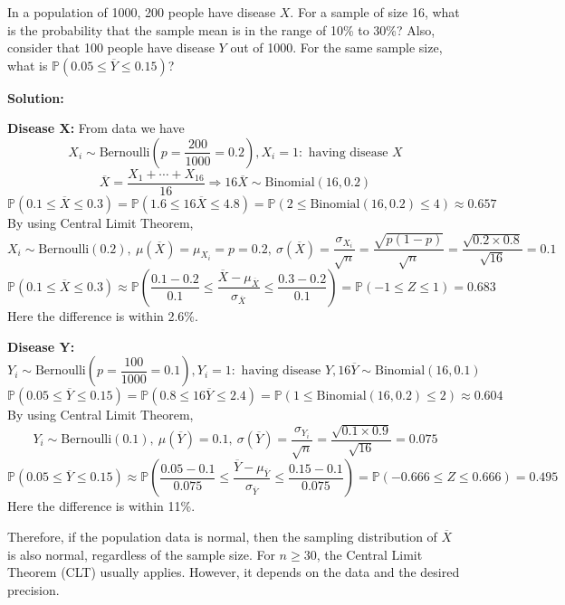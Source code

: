 \begin{eg}
  In a population of 1000, 200 people have disease \(X\). For a sample of size 16, what is the probability that the sample mean is in the range of 10\% to 30\%? Also, consider that 100 people have disease \(Y\) out of 1000. For the same sample size, what is \(\mathbb{P}(0.05 \leq \overline{Y} \leq 0.15)\)?

  \textbf{Solution:} 

  \textbf{Disease X:}
  From data we have 
  \[
    X_i \sim \text{Bernoulli}\left(p = \dfrac{200}{1000} = 0.2\right), X_i = 1: \text{ having disease } X
  \]
  \[
    \overline{X} = \dfrac{X_1 + \cdots + X_{16}}{16} \Longrightarrow 16\overline{X} \sim \text{Binomial}(16, 0.2)
  \]
  \[
    \mathbb{P}(0.1 \leq \overline{X} \leq 0.3) = \mathbb{P}(1.6 \leq 16\overline{X} \leq 4.8) = \mathbb{P}(2 \leq \text{Binomial}(16, 0.2) \leq 4) \approx 0.657
  \]
  By using Central Limit Theorem, 
  \[
    X_i \sim \text{Bernoulli}(0.2),\ \mu(\overline{X}) = \mu_{X_i} = p = 0.2,\ \sigma(\overline{X}) = \dfrac{\sigma_{X_i}}{\sqrt{n}} = \dfrac{\sqrt{p(1 - p)}}{\sqrt{n}} = \dfrac{\sqrt{0.2 \times 0.8}}{\sqrt{16}} = 0.1
  \]
  \[
    \mathbb{P}(0.1 \leq \overline{X} \leq 0.3) \approx \mathbb{P}\left(\dfrac{0.1 - 0.2}{0.1} \leq \dfrac{\overline{X} - \mu_{\overline{X}}}{\sigma_{\overline{X}}} \leq \dfrac{0.3 - 0.2}{0.1}\right) = \mathbb{P}(-1 \leq Z \leq 1) = 0.683
  \]
  Here the difference is within 2.6\%. 

  \textbf{Disease Y:} 
  \[
    Y_i \sim \text{Bernoulli}\left(p = \dfrac{100}{1000} = 0.1\right), Y_i = 1: \text{ having disease } Y, 16\overline{Y} \sim \text{Binomial}(16, 0.1)
  \]
  \[
    \mathbb{P}(0.05 \leq \overline{Y} \leq 0.15) = \mathbb{P}(0.8 \leq 16\overline{Y} \leq 2.4) = \mathbb{P}(1 \leq \text{Binomial}(16, 0.2) \leq 2) \approx 0.604
  \]
  By using Central Limit Theorem, 
  \[
    Y_i \sim \text{Bernoulli}(0.1),\ \mu(\overline{Y}) = 0.1,\ \sigma(\overline{Y}) = \dfrac{\sigma_{Y_i}}{\sqrt{n}} = \dfrac{\sqrt{0.1 \times 0.9}}{\sqrt{16}} = 0.075
  \]
  \[
    \mathbb{P}(0.05 \leq \overline{Y} \leq 0.15) \approx \mathbb{P}\left(\dfrac{0.05 - 0.1}{0.075} \leq \dfrac{\overline{Y} - \mu_{\overline{Y}}}{\sigma_{\overline{Y}}} \leq \dfrac{0.15 - 0.1}{0.075}\right) = \mathbb{P}(-0.666 \leq Z \leq 0.666) = 0.495
  \]
  Here the difference is within 11\%. 
\end{eg}
Therefore, if the population data is normal, then the sampling distribution of \(\overline{X}\) is also normal, regardless of the sample size. For \(n \geq 30\), the Central Limit Theorem (CLT) usually applies. However, it depends on the data and the desired precision.

